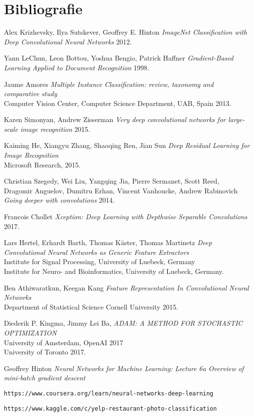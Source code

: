 \section{Bibliografie}
\begingroup
\renewcommand{\section}[2]{}
\begin{thebibliography}{1}

 Alex Krizhevsky, Ilya Sutskever, Geoffrey E. Hinton {\em ImageNet Classification with Deep Convolutional Neural Networks}  2012.

 Yann LeChun, Leon Bottou, Yoshua Bengio, Patrick Haffner {\em Gradient-Based Learning Applied to Document Recognition} 1998.

 Jaume Amores {\em Multiple Instance Classification: review, taxonomy and
comparative study} \\
Computer Vision Center, Computer Science Department, UAB, Spain 2013.

 Karen Simonyan, Andrew Zisserman {\em Very deep convolutional networks for large-scale image recognition} 2015.

  Kaiming He, Xiangyu Zhang,  Shaoqing Ren, Jian Sun {\em Deep Residual Learning for Image Recognition} \\
Microsoft Research, 2015.

 Christian Szegedy, Wei Liu, Yangqing Jia, Pierre Sermanet, Scott Reed, Dragomir Anguelov, Dumitru Erhan, Vincent Vanhoucke, Andrew Rabinovich {\em Going deeper with convolutions} 2014.

 Francois Chollet {\em Xception: Deep Learning with Depthwise Separable Convolutions} 2017.

 Lars Hertel, Erhardt Barth, Thomas Käster, Thomas Martinetz {\em Deep Convolutional Neural Networks as Generic Feature Extractors} \\
Institute for Signal Processing, University of Luebeck, Germany \\
Institute for Neuro- and Bioinformatics, University of Luebeck, Germany.

 Ben Athiwaratkun, Keegan Kang {\em Feature Representation In Convolutional Neural
Networks} \\
Department of Statistical Science Cornell University 2015.

 Diederik P. Kingma, Jimmy Lei Ba, {\em ADAM: A METHOD FOR STOCHASTIC OPTIMIZATION} \\
University of Amsterdam, OpenAI 2017\\
University of Toronto 2017.

 Geoffrey Hinton {\em Neural Networks for Machine Learning: Lecture 6a	Overview of	mini-batch gradient descent	}

 \texttt{https://www.coursera.org/learn/neural-networks-deep-learning}

 \texttt{https://www.kaggle.com/c/yelp-restaurant-photo-classification}

\end{thebibliography}
\endgroup